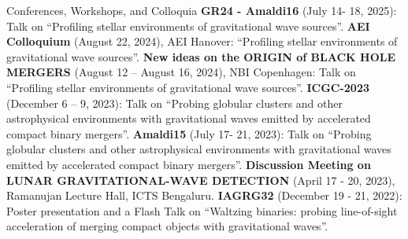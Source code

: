\begin{rubric}{Conferences, Workshops, and Colloquia}
\entry*[] \textbf{GR24 - Amaldi16} (July 14- 18, 2025): Talk on ``Profiling stellar environments of gravitational wave sources''.
%
\entry*[] \textbf{AEI Colloquium} (August 22, 2024), AEI Hanover: ``Profiling stellar environments of gravitational wave sources''.
%
\entry*[] \textbf{New ideas on the ORIGIN of BLACK HOLE MERGERS} (August 12 – August 16, 2024), NBI Copenhagen: Talk on ``Profiling stellar environments of gravitational wave sources''.
%
\entry*[] \textbf{ICGC-2023} (December 6 – 9, 2023): Talk on ``Probing globular clusters and other astrophysical environments with gravitational waves emitted by accelerated compact binary mergers''.
%
\entry*[] \textbf{Amaldi15} (July 17- 21, 2023): Talk on ``Probing globular clusters and other astrophysical environments with gravitational waves emitted by accelerated compact binary mergers''.
%
\entry*[] \textbf{Discussion Meeting on LUNAR GRAVITATIONAL-WAVE DETECTION} (April 17 - 20, 2023), Ramanujan Lecture Hall, ICTS Bengaluru.
%
\entry*[] \textbf{IAGRG32} (December 19 - 21, 2022): Poster presentation and a Flash Talk on ``Waltzing binaries: probing line-of-sight acceleration of merging compact objects with gravitational waves''.
%

\end{rubric}
